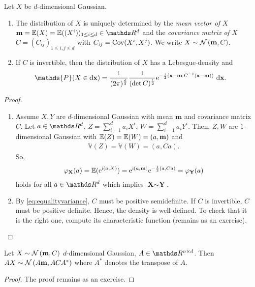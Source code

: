 \begin{thm}
Let $X$ be $d$-dimensional Gaussian.
\begin{enumerate}[label=(\alph*)]
\item The distribution of $X$ is uniquely determined by the \emph{mean vector of $X$} $\textbf{m}=\E{X}=\E{(X^i)}_{1\leq i\leq d} \in \Rd$ and the \emph{covariance matrix of $X$} $C=(C_{ij})_{1\leq i,j\leq d}$ with $C_{ij}=\operatorname{Cov}(X^i,X^j)$.
We write $X \sim \mathcal{N}\left(\textbf{m},C\right)$.
\item If $C$ is invertible, then the distribution of $X$ has a Lebesgue-density and
\begin{align*}
	\mathds{P}(X \in \mathrm{d}\textbf{x})
	&= \frac{1}{(2 \pi)^{\frac{d}{2}}} \frac{1}{(\det C)^{\frac{1}{2}}} \e^{-\frac{1}{2}(\textbf{x}-\textbf{m},C^{-1}(\textbf{x}-\textbf{m}))}~\mathrm{d}\textbf{x}.
\qedhere
\end{align*}
\end{enumerate}
\end{thm}
\begin{proof}
\begin{enumerate}[label=(\alph*)]
\item Assume $X,Y$ are $d$-dimensional Gaussian with mean $\textbf{m}$ and covariance matrix $C$.
Let $a\in \Rd$, $Z=\sum_{i=1}^d a_iX^i$, $W=\sum_{i=1}^d a_i Y^i$.
Then, $Z,W$ are $1$-dimensional Gaussian with $\E{Z}=\E{W}=(a,\textbf{m})$ and
\begin{align}\label{eq:equalityvariance}
\mathds{V}(Z)=\mathds{V}(W)=(a,Ca).
\end{align}
So,
\begin{align*}
\varphi_{\textbf{X}}(a)=\E{\e^{\i (a,X)}}=\e^{\i (a,\textbf{m})}\e^{-\frac{1}{2}(a,Ca)}=\varphi_\textbf{Y}(a)
\end{align*}
holds for all $a\in\Rd$ which implies $\textbf{X}\sim \textbf{Y}$.
\item By \eqref{eq:equalityvariance}, $C$ must be positive semidefinite. If $C$ is invertible, $C$ must be positive definite.
Hence, the density is well-defined.
To check that it is the right one, compute its characteristic function (remains as an exercise). \qedhere
\end{enumerate}
\end{proof}

\begin{prop}
Let $X \sim \mathcal{N}\left(\textbf{m},C\right)$ $d$-dimensional Gaussian, $A \in \R^{n\times d}$.
Then $AX\sim \mathcal{N}\left(A\textbf{m},ACA^\ast\right)$ where $A^\ast$ denotes the transpose of $A$.
\end{prop}
\begin{proof}
The proof remains as an exercise.
\end{proof}

